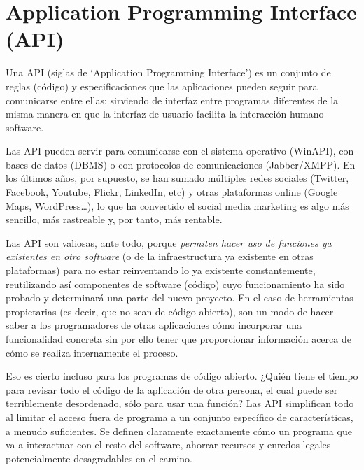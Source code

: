  \section{Application Programming Interface (API)}
 	Una API (siglas de ‘Application Programming Interface’) es un conjunto de reglas (código) y especificaciones que las aplicaciones pueden seguir para comunicarse entre ellas: sirviendo de interfaz entre programas diferentes de la misma manera en que la interfaz de usuario facilita la interacción humano-software.

	Las API pueden servir para comunicarse con el sistema operativo (WinAPI), con bases de datos (DBMS) o con protocolos de comunicaciones (Jabber/XMPP). En los últimos años, por supuesto, se han sumado múltiples redes sociales (Twitter, Facebook, Youtube, Flickr, LinkedIn, etc) y otras plataformas online (Google Maps, WordPress…), lo que ha convertido el social media marketing es algo más sencillo, más rastreable y, por tanto, más rentable.

	Las API son valiosas, ante todo, porque \emph{permiten hacer uso de funciones ya existentes en otro software} (o de la infraestructura ya existente en otras plataformas) para no estar reinventando lo ya existente constantemente, reutilizando así componentes de software (código) cuyo funcionamiento ha sido probado y determinará una parte del nuevo proyecto. En el caso de herramientas propietarias (es decir, que no sean de código abierto), son un modo de hacer saber a los programadores de otras aplicaciones cómo incorporar una funcionalidad concreta sin por ello tener que proporcionar información acerca de cómo se realiza internamente el proceso. \cite{3}

	Eso es cierto incluso para los programas de código abierto. ¿Quién tiene el tiempo para revisar todo el código de la aplicación de otra persona, el cual puede ser terriblemente desordenado, sólo para usar una función? Las API simplifican todo al limitar el acceso fuera de programa a un conjunto específico de características, a menudo suficientes. Se definen claramente exactamente cómo un programa que va a interactuar con el resto del software, ahorrar recursos y enredos legales potencialmente desagradables en el camino. \cite{10}
